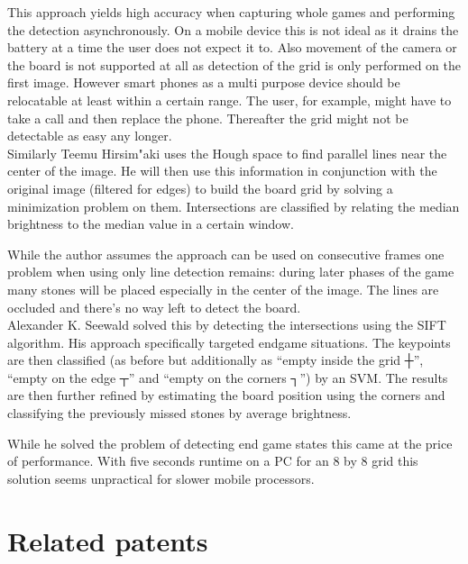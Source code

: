 	This approach yields high accuracy when capturing whole games and performing the detection asynchronously. On a mobile device this is not ideal as it drains the battery at a time the user does not expect it to. Also movement of the camera or the board is not supported at all as detection of the grid is only performed on the first image. However smart phones as a multi purpose device should be relocatable at least within a certain range. The user, for example, might have to take a call and then replace the phone. Thereafter the grid might not be detectable as easy any longer.
	\\

	Similarly Teemu Hirsim"aki \cite{hirsimaki2005extracting} uses the Hough space to find parallel lines near the center of the image. He will then use this information in conjunction with the original image (filtered for edges) to build the board grid by solving a minimization problem on them. Intersections are classified by relating the median brightness to the median value in a certain window.

	While the author assumes the approach can be used on consecutive frames one problem when using only line detection remains: during later phases of the game many stones will be placed especially in the center of the image. The lines are occluded and there's no way left to detect the board.
	\\

	Alexander K. Seewald \cite{seewald2010automatic} solved this by detecting the intersections using the SIFT algorithm. His approach specifically targeted endgame situations. The keypoints are then classified (as before but additionally as ``empty inside the grid ┼'', ``empty on the edge ┬'' and ``empty on the corners ┐'') by an SVM. The results are then further refined by estimating the board position using the corners and classifying the previously missed stones by average brightness.

	While he solved the problem of detecting end game states this came at the price of performance. With five seconds runtime on a PC for an 8 by 8 grid this solution seems unpractical for slower mobile processors.

	\section{Related patents}
	\label{introduction-patents}


